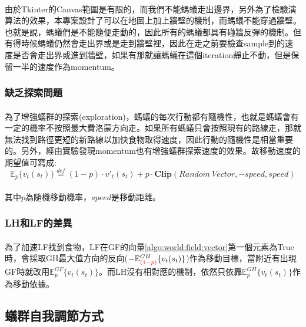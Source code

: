 \documentclass[]{article}
\begin{document}
\paragraph{}
由於Tkinter的Canvas範圍是有限的，而我們不能螞蟻走出邊界，另外為了檢驗演算法的效果，本專案設計了可以在地圖上加上牆壁的機制，而螞蟻不能穿過牆壁。也就是說，螞蟻們是不能隨便走動的，因此所有的螞蟻都具有碰牆反彈的機制。但有得時候螞蟻仍然會走出界或是走到牆壁裡，因此在走之前要檢查sample到的速度是否會走出界或進到牆壁，如果有那就讓螞蟻在這個iteration靜止不動，但是保留一半的速度作為momentum。
\subsubsection{缺乏探索問題}
\label{algo:move:exploration}
\paragraph{}
為了增強蟻群的探索(exploration)，螞蟻的每次行動都有隨機性，也就是螞蟻會有一定的機率不按照最大費洛蒙方向走。如果所有螞蟻只會按照現有的路線走，那就無法找到路徑更短的新路線以加快食物取得速度，因此行動的隨機性是相當重要的。另外，經由實驗發現momentum也有增強蟻群探索速度的效果。故移動速度的期望值可寫成:
\begin{equation}\label{algo:move:exploration:moveExpect}
	\mathbb{E}_p\{v_{t}(s_{t})\} \stackrel{def}{=} (1 - p) \cdot v'_{t}(s_{t}) + p \cdot \mathbf{Clip} (Random \ Vector, -speed, speed)
\end{equation}
\paragraph{}
其中$p$為隨機移動機率，$speed$是移動距離。
\subsubsection{LH和LF的差異}
\paragraph{}
為了加速LF找到食物，LF在GF的向量\eqref{algo:world:field:vector}第一個元素為True時，會採取GH最大值方向的反向($ -\mathbb{E}^{GH}_{\textcolor{red}{(1-p)}}\{v_{t}(s_{t})\} $)作為移動目標，當附近有出現GF時就改用$ \mathbb{E}^{GF}_p\{v_{t}(s_{t})\} $。而LH沒有相對應的機制，依然只依靠$ \mathbb{E}^{GH}_p\{v_{t}(s_{t})\} $作為移動依據。

\subsection{蟻群自我調節方式}
\label{algo:colony}
\end{document}
